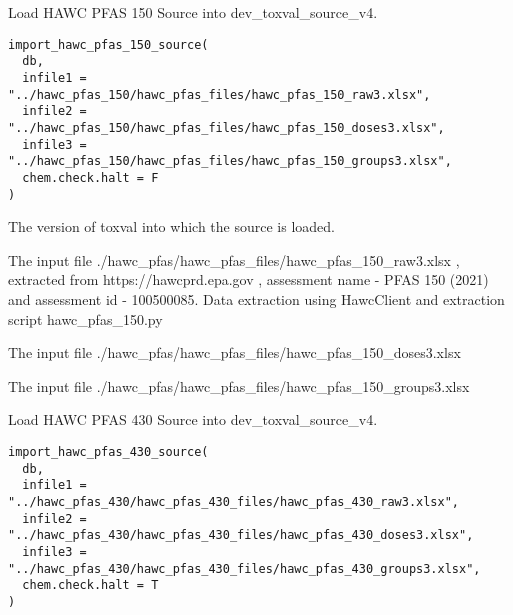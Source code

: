 \documentclass[letterpaper]{book}
\begin{document}
%
\begin{Description}\relax
Load HAWC PFAS 150 Source into dev\_toxval\_source\_v4.
\end{Description}
%
\begin{Usage}
\begin{verbatim}
import_hawc_pfas_150_source(
  db,
  infile1 = "../hawc_pfas_150/hawc_pfas_files/hawc_pfas_150_raw3.xlsx",
  infile2 = "../hawc_pfas_150/hawc_pfas_files/hawc_pfas_150_doses3.xlsx",
  infile3 = "../hawc_pfas_150/hawc_pfas_files/hawc_pfas_150_groups3.xlsx",
  chem.check.halt = F
)
\end{verbatim}
\end{Usage}
%
\begin{Arguments}
\begin{ldescription}
\item[\code{db}] The version of toxval into which the source is loaded.

\item[\code{infile1}] The input file ./hawc\_pfas/hawc\_pfas\_files/hawc\_pfas\_150\_raw3.xlsx , extracted
from https://hawcprd.epa.gov , assessment name - PFAS 150 (2021) and assessment id - 100500085.
Data extraction using HawcClient and extraction script hawc\_pfas\_150.py

\item[\code{infile2}] The input file ./hawc\_pfas/hawc\_pfas\_files/hawc\_pfas\_150\_doses3.xlsx

\item[\code{infile3}] The input file ./hawc\_pfas/hawc\_pfas\_files/hawc\_pfas\_150\_groups3.xlsx
\end{ldescription}
\end{Arguments}
%
\begin{Description}\relax
Load HAWC PFAS 430 Source into dev\_toxval\_source\_v4.
\end{Description}
%
\begin{Usage}
\begin{verbatim}
import_hawc_pfas_430_source(
  db,
  infile1 = "../hawc_pfas_430/hawc_pfas_430_files/hawc_pfas_430_raw3.xlsx",
  infile2 = "../hawc_pfas_430/hawc_pfas_430_files/hawc_pfas_430_doses3.xlsx",
  infile3 = "../hawc_pfas_430/hawc_pfas_430_files/hawc_pfas_430_groups3.xlsx",
  chem.check.halt = T
)
\end{verbatim}
\end{Usage}
\end{document}
